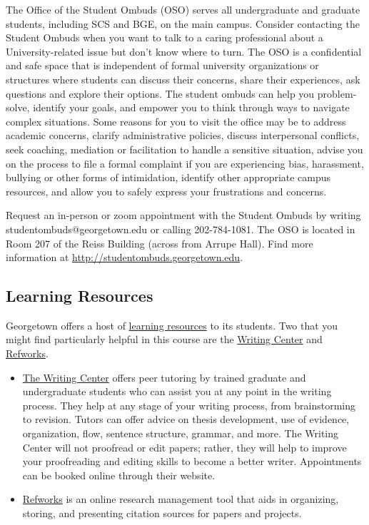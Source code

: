 \documentclass[
  letterpaper,
  DIV=11,
  numbers=noendperiod]{scrartcl}
\providecommand{\tightlist}{%
  \setlength{\itemsep}{0pt}\setlength{\parskip}{0pt}}
\begin{document}
The Office of the Student Ombuds (OSO) serves all undergraduate and
graduate students, including SCS and BGE, on the main campus. Consider
contacting the Student Ombuds when you want to talk to a caring
professional about a University-related issue but don't know where to
turn. The OSO is a confidential and safe space that is independent of
formal university organizations or structures where students can discuss
their concerns, share their experiences, ask questions and explore their
options. The student ombuds can help you problem-solve, identify your
goals, and empower you to think through ways to navigate complex
situations. Some reasons for you to visit the office may be to address
academic concerns, clarify administrative policies, discuss
interpersonal conflicts, seek coaching, mediation or facilitation to
handle a sensitive situation, advise you on the process to file a formal
complaint if you are experiencing bias, harassment, bullying or other
forms of intimidation, identify other appropriate campus resources, and
allow you to safely express your frustrations and concerns.

Request an in-person or zoom appointment with the Student Ombuds by
writing studentombuds@georgetown.edu or calling 202-784-1081. The OSO is
located in Room 207 of the Reiss Building (across from Arrupe Hall).
Find more information at
\href{http://studentombuds.georgetown.edu/}{http://studentombuds.georgetown.edu}.

\subsection{\texorpdfstring{\textbf{Learning
Resources}}{Learning Resources}}\label{learning-resources}

Georgetown offers a host of
\href{http://scs.georgetown.edu/academic-affairs/resources/}{learning
resources} to its students. Two that you might find particularly helpful
in this course are the
\href{https://writingcenter.georgetown.edu/}{Writing Center} and
\href{http://guides.library.georgetown.edu/refworks}{Refworks}.

\begin{itemize}
\tightlist
\item
  \href{https://writingcenter.georgetown.edu/}{The Writing Center}
  offers peer tutoring by trained graduate and undergraduate students
  who can assist you at any point in the writing process. They help at
  any stage of your writing process, from brainstorming to revision.
  Tutors can offer advice on thesis development, use of evidence,
  organization, flow, sentence structure, grammar, and more. The Writing
  Center will not proofread or edit papers; rather, they will help to
  improve your proofreading and editing skills to become a better
  writer. Appointments can be booked online through their website.\\
\item
  \href{http://guides.library.georgetown.edu/refworks}{Refworks} is an
  online research management tool that aids in organizing, storing, and
  presenting citation sources for papers and projects.
\end{itemize}
\end{document}
